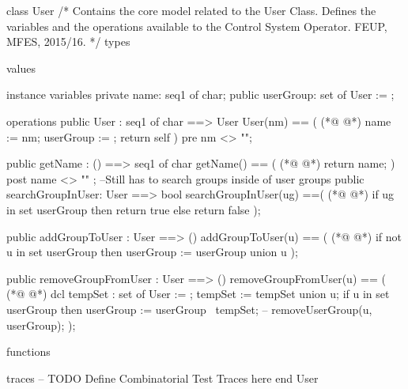 \begin{vdmpp}[breaklines=true]
class User
/*
  Contains the core model related to the User Class.
  Defines the variables and the operations available to the Control System Operator.
  FEUP, MFES, 2015/16.
*/
types
 
values

instance variables
 private name: seq1 of char;
 public userGroup: set of User := { };

operations
 public User : seq1 of char ==> User
  User(nm) == (
(*@
\label{User:18}
@*)
   name := nm;
   userGroup := {};
   return self
  )
  pre nm <> "";
 
 public getName : () ==> seq1 of char
   getName() == (
(*@
\label{getName:26}
@*)
   return name;
   )
   post name <> ""
   ;
  --Still has to search groups inside of user groups
 public searchGroupInUser: User ==> bool
  searchGroupInUser(ug) ==(
(*@
\label{searchGroupInUser:33}
@*)
  if ug in set userGroup
  then return true
  else return false
  );
  
 public addGroupToUser : User ==> ()
   addGroupToUser(u) == (
(*@
\label{addGroupToUser:40}
@*)
   if not u in set userGroup
   then userGroup := userGroup union {u} 
  );
  
  public removeGroupFromUser : User ==> ()
   removeGroupFromUser(u) == (
(*@
\label{removeGroupFromUser:46}
@*)
   dcl tempSet : set of User := {};
   tempSet := tempSet union {u};
   if u in set userGroup
   then userGroup := userGroup \ tempSet; 
   -- removeUserGroup(u, userGroup);
 );
  
functions

traces
-- TODO Define Combinatorial Test Traces here
end User
\end{vdmpp}
